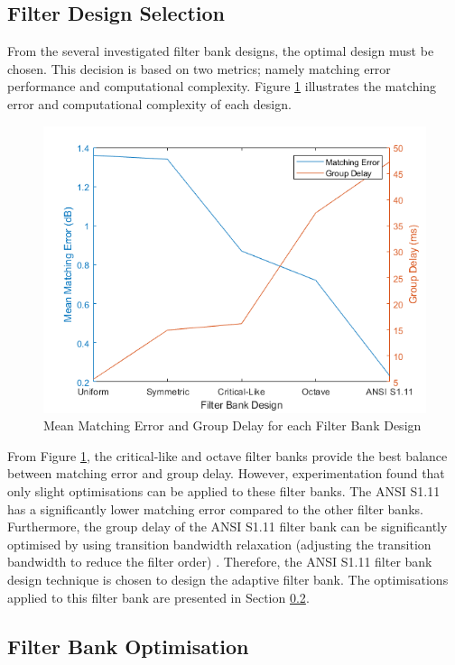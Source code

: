 \documentclass[11pt,onecolumn]{witseiepaper}
\begin{document}
\subsection{Filter Design Selection}
\label{sec:filtSelect}

\noindent From the several investigated filter bank designs, the optimal design must be chosen. This decision is based on two metrics; namely matching error performance and computational complexity. Figure \ref{fig:matErrDelay} illustrates the matching error and computational complexity of each design.

\begin{figure}[h]
\centering
\includegraphics[width=0.6\linewidth]{matErrDelay.PNG}
\caption{Mean Matching Error and Group Delay for each Filter Bank Design}
\label{fig:matErrDelay}
\end{figure}

\noindent From Figure \ref{fig:matErrDelay}, the critical-like and octave filter banks provide the best balance between matching error and group delay. However, experimentation found that only slight optimisations can be applied to these filter banks. The ANSI S1.11 has a significantly lower matching error compared to the other filter banks. Furthermore, the group delay of the ANSI S1.11 filter bank can be significantly optimised by using transition bandwidth relaxation (adjusting the transition bandwidth to reduce the filter order) \cite{chang}. Therefore, the ANSI S1.11 filter bank design technique is chosen to design the adaptive filter bank. The optimisations applied to this filter bank are presented in Section \ref{sec:filtBankOpt}.

\subsection{Filter Bank Optimisation}
\label{sec:filtBankOpt}
\end{document}

